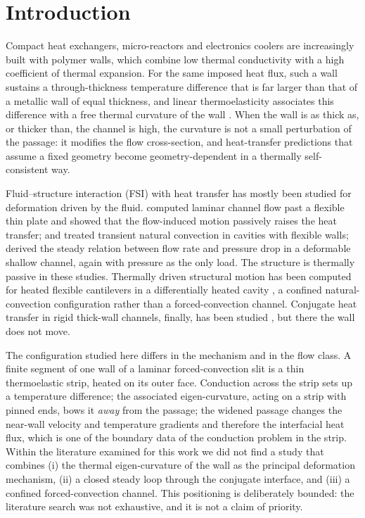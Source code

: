 \section{Introduction}
\label{sec:intro}

Compact heat exchangers, micro-reactors and electronics coolers are increasingly built with polymer
walls, which combine low thermal conductivity with a high coefficient of thermal expansion. For the
same imposed heat flux, such a wall sustains a through-thickness temperature difference that is
far larger than that of a metallic wall of equal thickness, and linear
thermoelasticity associates this difference with a free thermal curvature of the wall
\citep{boley1960theory,timoshenko1970elasticity}. When the wall is as thick as, or thicker than, the
channel is high, the curvature is not a small perturbation of the passage: it modifies the flow
cross-section, and heat-transfer predictions that assume a fixed geometry become geometry-dependent
in a thermally self-consistent way.

Fluid--structure interaction (FSI) with heat transfer has mostly been studied for deformation
driven by the fluid. \citet{soti2015steady} computed laminar channel flow past a flexible thin plate
and showed that the flow-induced motion passively raises the heat transfer; \citet{alsabery2019numerical}
and \citet{saleh2025laminar} treated transient natural convection in cavities with flexible walls;
\citet{christov2018flow} derived the steady relation between flow rate and pressure drop in a
deformable shallow channel, again with pressure as the only load. The structure is thermally passive
in these studies. Thermally driven structural motion has been computed for heated flexible
cantilevers in a differentially heated cavity \citep{kumar2026thermo}, a confined natural-convection
configuration rather than a forced-convection channel. Conjugate heat transfer in rigid thick-wall channels, finally,
has been studied \citep{rahimi2024conjugate}, but there the wall does not move.

The configuration studied here differs in the mechanism and in the flow class. A finite segment of
one wall of a laminar forced-convection slit is a thin thermoelastic strip, heated on its outer
face. Conduction across the strip sets up a temperature difference; the associated eigen-curvature,
acting on a strip with pinned ends, bows it \emph{away} from the passage; the widened passage
changes the near-wall velocity and temperature gradients and therefore the interfacial heat flux,
which is one of the boundary data of the conduction problem in the strip. Within the literature
examined for this work we did not find a study that combines (i) the thermal eigen-curvature of the
wall as the principal deformation mechanism, (ii) a closed steady loop through the conjugate
interface, and (iii) a confined forced-convection channel. This positioning is deliberately bounded:
the literature search was not exhaustive, and it is not a claim of priority.

